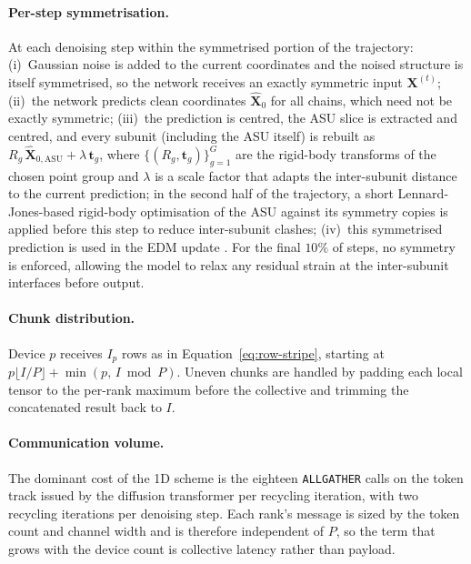 \paragraph{Per-step symmetrisation.}
At each denoising step within the symmetrised portion of the trajectory:
(i)~Gaussian noise is added to the current coordinates and the noised structure is
itself symmetrised, so the network receives an exactly symmetric input
$\mathbf{X}^{(t)}$; (ii)~the network predicts clean coordinates
$\hat{\mathbf{X}}_0$ for all chains, which need not be exactly symmetric;
(iii)~the prediction is centred, the ASU slice is extracted and centred, and every
subunit (including the ASU itself) is rebuilt as
$R_g\,\hat{\mathbf{X}}_{0,\text{ASU}} + \lambda\,\mathbf{t}_g$, where
$\{(R_g,\mathbf{t}_g)\}_{g=1}^{G}$ are the rigid-body transforms of the chosen
point group and $\lambda$ is a scale factor that adapts the inter-subunit distance
to the current prediction; in the second half of the trajectory, a short
Lennard-Jones-based rigid-body optimisation of the ASU against its symmetry copies
is applied before this step to reduce inter-subunit clashes; (iv)~this symmetrised
prediction is used in the EDM update \parencite{karras_elucidating_2022}. For the
final $10\%$ of steps, no symmetry is enforced, allowing the model to relax any
residual strain at the inter-subunit interfaces before output.

\paragraph{Chunk distribution.}
Device $p$ receives $I_p$ rows as in Equation~\eqref{eq:row-stripe}, starting at
$p\lfloor I/P\rfloor + \min(p,\, I \bmod P)$. Uneven chunks are handled by padding
each local tensor to the per-rank maximum before the collective and trimming the
concatenated result back to $I$.

\paragraph{Communication volume.}
The dominant cost of the 1D scheme is the eighteen \texttt{ALLGATHER} calls on the
token track issued by the diffusion transformer per recycling iteration, with two
recycling iterations per denoising step. Each rank's message is sized by the token
count and channel width and is therefore independent of $P$, so the term that
grows with the device count is collective latency rather than payload.

